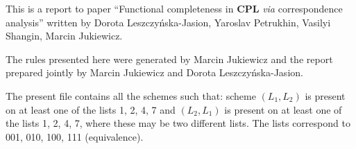 \documentclass[11pt]{article}
\begin{document}
	
	This is a report to paper ``Functional completeness in \textbf{CPL} \textit{via} correspondence analysis'' written by Dorota Leszczy\'{n}ska-Jasion, 
	Yaroslav Petrukhin, Vasilyi Shangin, Marcin Jukiewicz. 
	
	The rules presented here were generated by Marcin Jukiewicz and the report prepared jointly by Marcin Jukiewicz and Dorota Leszczy\'{n}ska-Jasion.
	
	The present file contains all the schemes such that: scheme $(L_1, L_2)$ is present on at least one of the lists 1, 2, 4, 7 and $(L_2, L_1)$ is present on at least one of the lists 1, 2, 4, 7, where these may be two different lists. The lists correspond to 001, 010, 100, 111 (equivalence).
	
	\bigskip
	
\begin{center}


\end{center}
\end{document}
